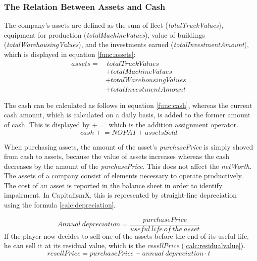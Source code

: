 \subsubsection{The Relation Between Assets and Cash}

The company's assets are defined as the sum of fleet (\textit{totalTruckValues}), equipment for production (\textit{totalMachineValues}), value of buildings (\textit{totalWarehousingValues}), and the investments earned (\textit{totalInvestmentAmount}), which is displayed in equation \ref{func:assets}:
\begin{equation}
    \label{func:assets}
    \begin{aligned}
        assets = & ~totalTruckValues \\
        &+ totalMachineValues \\ 
        &+ totalWarehousingValues \\
        &+ totalInvestmentAmount
    \end{aligned}
\end{equation}

The cash can be calculated as follows in equation \ref{func:cash}, whereas the current cash amount, which is calculated on a daily basis, is added to the former amount of cash. This is displayed by $+=$ which is the addition assignment operator.
\begin{equation}
    \label{func:cash}
    cash \mathrel{+}= NOPAT + assetsSold 
\end{equation}

When purchasing assets, the amount of the asset's \textit{purchasePrice} is simply shoved from cash to assets, because the value of assets increases whereas the cash decreases by the amount of the \textit{purchasePrice}. This does not affect the \textit{netWorth}.
The assets of a company consist of elements necessary to operate productively. The cost of an asset is reported in the balance sheet in order to identify impairment. In CapitalismX, this is represented by straight-line depreciation using the formula \ref{calc:depreciation}. 
    
\begin{equation}
     \label{calc:depreciation}
     Annual \ depreciation = {\frac{purchasePrice}{useful \ life \ of \ the \ asset}}
\end{equation}
If the player now decides to sell one of the assets before the end of its useful life, he can sell it at its residual value, which is the \textit{resellPrice} (\ref{calc:residualvalue}). 
\begin{equation}
     \label{calc:residualvalue}
     resellPrice = {{purchasePrice} - {annual \ depreciation \cdot t }}
\end{equation}

